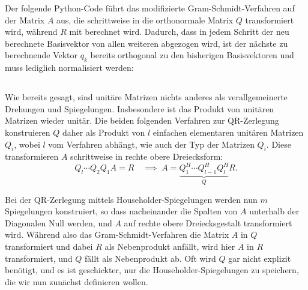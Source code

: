 Der folgende Python-Code führt das modifizierte Gram-Schmidt-Verfahren
auf der Matrix $A$ aus, die schrittweise in die orthonormale Matrix
$Q$ transformiert wird, während $R$ mit berechnet wird. Dadurch, dass
in jedem Schritt der neu berechnete Basisvektor von allen weiteren
abgezogen wird, ist der nächste zu berechnende Vektor $q_k$ bereits
orthogonal zu den bisherigen Basisvektoren und muss lediglich
normalisiert werden:


\subsection{}

Wie bereits gesagt, sind unitäre Matrizen nichts anderes als
verallgemeinerte Drehungen und Spiegelungen. Insbesondere ist das
Produkt von unitären Matrizen wieder unitär. Die beiden folgenden
Verfahren zur QR-Zerlegung konstruieren $Q$ daher als Produkt von $l$
einfachen elementaren unitären Matrizen $Q_i$, wobei $l$ vom Verfahren
abhängt, wie auch der Typ der Matrizen $Q_i$. Diese transformieren $A$
schrittweise in rechte obere Dreiecksform:
\begin{equation}
  \label{eq:unitprod}
  Q_l\cdots Q_2Q_1A = R\quad\implies\; A =
  \underbrace{Q_1^H\cdots Q_{l-1}^HQ_l^H}_Q R.
\end{equation}

Bei der QR-Zerlegung mittels Householder-Spiegelungen werden nun $m$
Spiegelungen konstruiert, so dass nacheinander die Spalten von $A$
unterhalb der Diagonalen Null werden, und $A$ auf rechte obere
Dreiecksgestalt transformiert wird. Während also das
Gram-Schmidt-Verfahren die Matrix $A$ in $Q$ transformiert und dabei
$R$ als Nebenprodukt anfällt, wird hier $A$ in $R$ transformiert, und
$Q$ fällt als Nebenprodukt ab. Oft wird $Q$ gar nicht explizit
benötigt, und es ist geschickter, nur die Householder-Spiegelungen zu
speichern, die wir nun zunächst definieren wollen.

